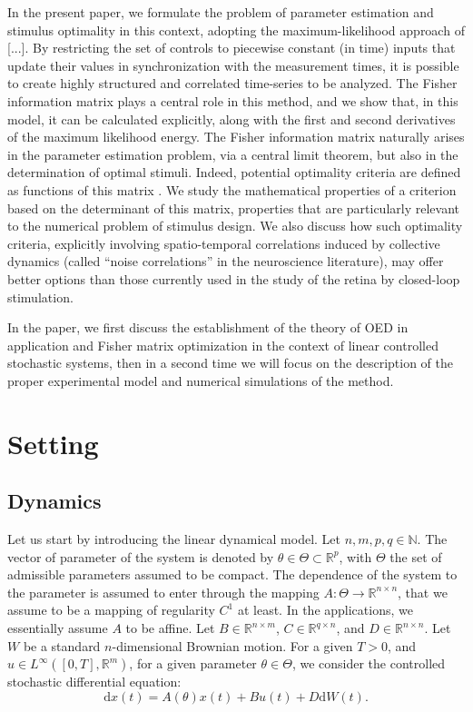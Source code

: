 \documentclass[twocolumn]{autart}
\theoremstyle{definition}
\theoremstyle{remark}
\newcommand{\R}{\mathbb{R}}
\newcommand{\N}{\mathbb{N}}
\newcommand{\diff}{\mathrm{d}}
\begin{document}
In the present paper, we formulate the problem of parameter estimation and stimulus optimality in this context, adopting the maximum-likelihood approach of [...]. By restricting the set of controls to piecewise constant (in time) inputs that update their values in synchronization with the measurement times, it is possible to create highly structured and correlated time-series to be analyzed.
The Fisher information matrix plays a central role in this method, and we show that, in this model, it can be calculated explicitly, along with the first and second derivatives of the maximum likelihood energy.
The Fisher information matrix naturally arises in the parameter estimation problem, via a central limit theorem, but also in the determination of optimal stimuli. Indeed, potential optimality criteria are defined as functions of this matrix \cite{Pukelsheim2006,Fedorov72}. We study the mathematical properties of a criterion based on the determinant of this matrix, properties that are particularly relevant to the numerical problem of stimulus design. We also discuss how such optimality criteria, explicitly involving spatio-temporal correlations induced by collective dynamics (called “noise correlations” in the neuroscience literature), may offer better options than those currently used in the study of the retina by closed-loop stimulation.

In the paper, we first discuss the establishment of the theory of OED in application and Fisher matrix optimization in the context of linear controlled stochastic systems, then in a second time we will focus on the description of the proper experimental model and numerical simulations of the method.

\section{Setting}


 
\subsection{Dynamics}
\label{S:dynamics}

Let us start by introducing the linear dynamical model. Let $n,m,p,q\in \N$. The vector of parameter of the system is denoted by $\theta\in \Theta\subset \R^p$, with $\Theta$ the set of admissible parameters assumed to be compact. The dependence of the system to the parameter is assumed to enter through the mapping $A:\Theta\to \R^{n\times n}$, that we assume to be a mapping of regularity $C^1$ at least. In the applications, we essentially assume $A$ to be affine. Let $B\in \R^{n\times m}$, $C\in \R^{q\times n}$, and $D\in \R^{n\times n}$. Let $W$ be a standard $n$-dimensional Brownian motion. For a given $T>0$, and $u\in L^\infty([0,T],\R^m)$, for a given parameter $\theta\in \Theta$,  we consider the controlled stochastic differential equation:
\begin{equation}\label{E:sde1}
\diff x(t)=A(\theta) x(t) + B u(t)+D \diff W(t).
\end{equation}
\end{document}
